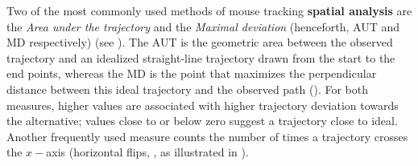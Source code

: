 \documentclass[11pt]{article}
\begin{document}
Two of the most commonly used methods of mouse tracking \textbf{spatial analysis} are the \textit{Area under the trajectory} and the \textit{Maximal deviation} (henceforth, AUT and MD respectively) (see \citealp{Freeman2010}).
The AUT is the geometric area between the observed trajectory and an idealized straight-line trajectory drawn from the start to the end points, whereas the MD is the point that maximizes the perpendicular distance between this ideal trajectory and the observed path
(). For both measures, higher values are associated with higher trajectory deviation towards the alternative; values close to or below zero suggest a trajectory close to ideal. 
Another frequently used measure counts the number of times a trajectory crosses the $x-$axis (horizontal flips, \citealp{Dale2011}, as illustrated in ).
\end{document}
